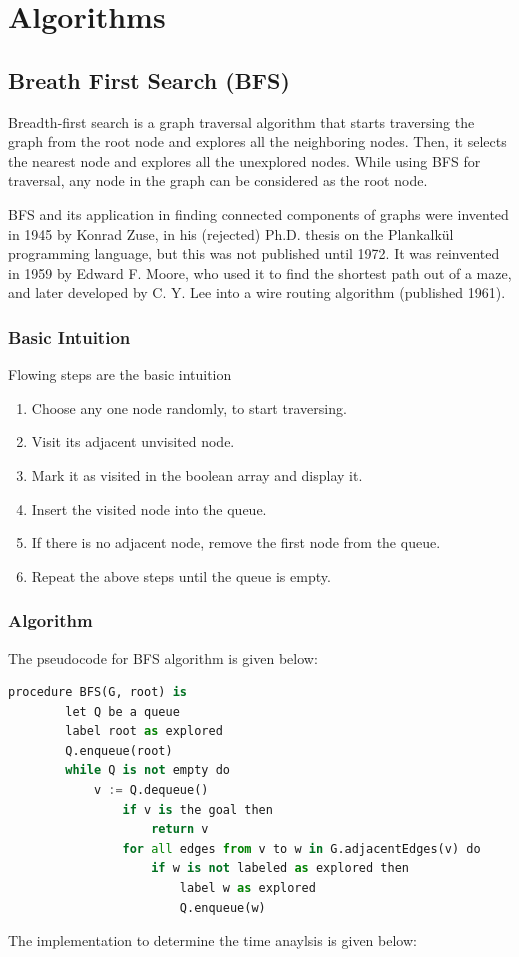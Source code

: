 \documentclass[a4paper, 12pt]{report}
\begin{document}
    \chapter{Algorithms}
    \section{Breath First Search (BFS)} 
	Breadth-first search is a graph traversal algorithm that starts traversing the graph from the root node and explores all the neighboring nodes. Then, it selects the nearest node and explores all the unexplored nodes. While using BFS for traversal, any node in the graph can be considered as the root node.\cite{BFS}
	
	BFS and its application in finding connected components of graphs were invented in 1945 by Konrad Zuse, in his (rejected) Ph.D. thesis on the Plankalkül programming language, but this was not published until 1972. It was reinvented in 1959 by Edward F. Moore, who used it to find the shortest path out of a maze, and later developed by C. Y. Lee into a wire routing algorithm (published 1961).\cite{BFS2}
	
	\subsection{Basic Intuition}
	Flowing steps are the basic intuition \cite{BFS1}
    \begin{enumerate}
        \item Choose any one node randomly, to start traversing.
        \item Visit its adjacent unvisited node.
        \item Mark it as visited in the boolean array and display it.
        \item Insert the visited node into the queue.
        \item If there is no adjacent node, remove the first node from the queue.
        \item Repeat the above steps until the queue is empty.
    \end{enumerate}
    
    \subsection{Algorithm}
    The pseudocode for BFS algorithm is given below:  \cite{BFS3}
    
    \begin{lstlisting}[language=Python]
    procedure BFS(G, root) is
        let Q be a queue
        label root as explored
        Q.enqueue(root)
        while Q is not empty do
            v := Q.dequeue()
                if v is the goal then
                    return v
                for all edges from v to w in G.adjacentEdges(v) do
                    if w is not labeled as explored then
                        label w as explored
                        Q.enqueue(w)
    \end{lstlisting}
The implementation to determine the time anaylsis is given below:
	
\end{document}
